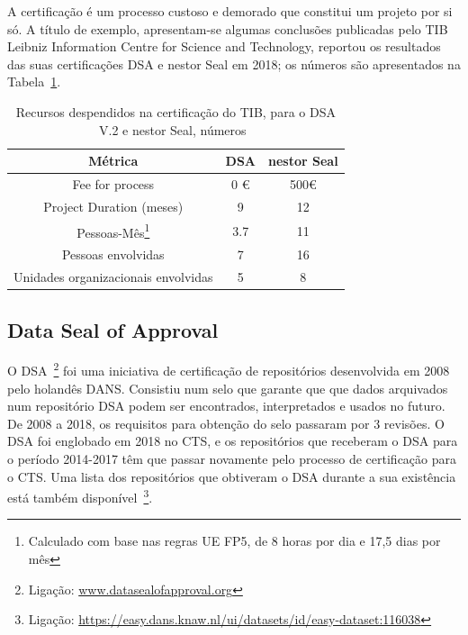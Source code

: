 \documentclass[sigconf,nonacm]{acmart}
\begin{document}
A certificação é um processo custoso e demorado que constitui um projeto por si só. A título de exemplo, apresentam-se algumas conclusões publicadas pelo TIB Leibniz Information Centre for Science and Technology, reportou os resultados das suas certificações \gls{DSA} e \gls{nestor} Seal em 2018; os números são apresentados na Tabela~\ref{tab:tib_certification_numbers}.

\begin{table}
    \caption{Recursos despendidos na certificação do TIB, para o DSA V.2 e nestor Seal, números~\cite{Lindlar_Schwab_2019}}\label{tab:tib_certification_numbers}
    \centering
    \scriptsize
    \begin{tabular}{|c|c|c|}
	\hline
    \textbf{Métrica} & \textbf{DSA} & \textbf{nestor Seal}\\
	\hline
	\hline
	Fee for process & 0 €  & 500€ \\
    Project Duration (meses) & 9 & 12 \\
	Pessoas-Mês\footnote{Calculado com base nas regras UE \gls{FP5}, de 8 horas por dia e 17,5 dias por mês} & 3.7 & 11\\
	Pessoas envolvidas & 7 & 16\\
	Unidades organizacionais envolvidas & 5 & 8\\
	\hline
    \end{tabular}
    \scriptsize
\end{table}

\subsection{Data Seal of Approval} %
\label{sub:data_seal_of_approval}


O \gls{DSA}~\footnote{Ligação: \url{www.datasealofapproval.org}} foi uma iniciativa de certificação de repositórios desenvolvida em 2008 pelo holandês \gls{DANS}. Consistiu num selo que garante que que dados arquivados num repositório DSA podem ser encontrados, interpretados e usados no futuro. De 2008 a 2018, os requisitos para obtenção do selo passaram por 3 revisões. O \gls{DSA} foi englobado em 2018 no \gls{CTS}, e os repositórios que receberam o \gls{DSA} para o período 2014-2017 têm que passar novamente pelo processo de certificação para o \gls{CTS}. Uma lista dos repositórios que obtiveram o \gls{DSA} durante a sua existência está também disponível~\footnote{Ligação: \url{https://easy.dans.knaw.nl/ui/datasets/id/easy-dataset:116038}}.
\end{document}
